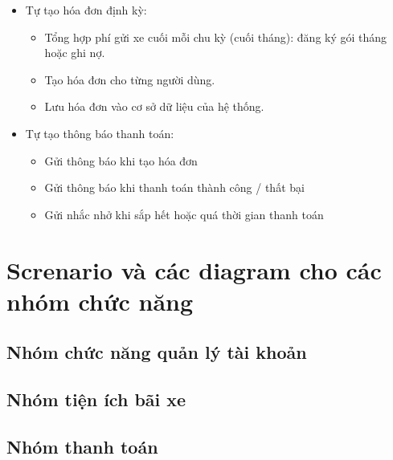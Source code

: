 \documentclass[a4paper,12pt]{article}
\begin{document}
\begin{itemize}
    \item Tự tạo hóa đơn định kỳ:
    \vspace*{-5pt}
    \begin{itemize}
        \item Tổng hợp phí gửi xe cuối mỗi chu kỳ (cuối tháng): đăng ký gói tháng hoặc ghi nợ.
        \item Tạo hóa đơn cho từng người dùng.
        \item Lưu hóa đơn vào cơ sở dữ liệu của hệ thống.

    \end{itemize}
\end{itemize}
\begin{itemize}
    \item Tự tạo thông báo thanh toán:
    \vspace*{-5pt}
    \begin{itemize}
        \item Gửi thông báo khi tạo hóa đơn
        \item Gửi thông báo khi thanh toán thành công / thất bại
        \item Gửi nhắc nhở khi sắp hết hoặc quá thời gian thanh toán
    \end{itemize}
\end{itemize}




\section{Screnario và các diagram cho các nhóm chức năng}
\vspace{-0.5cm}
\subsection{Nhóm chức năng quản lý tài khoản}


\subsection{Nhóm tiện ích bãi xe}


\subsection{Nhóm thanh toán}

\end{document}
